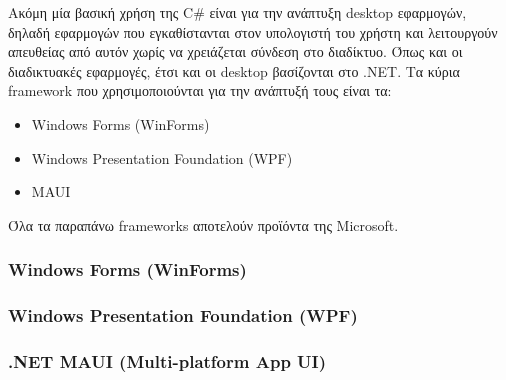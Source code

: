 Ακόμη μία βασική χρήση της C\# είναι για την ανάπτυξη desktop εφαρμογών,
δηλαδή εφαρμογών που εγκαθίστανται στον υπολογιστή του χρήστη και λειτουργούν
απευθείας από αυτόν χωρίς να χρειάζεται σύνδεση στο διαδίκτυο. Όπως και οι διαδικτυακές
εφαρμογές, έτσι και οι desktop βασίζονται στο .NET. Τα κύρια framework που χρησιμοποιούνται 
για την ανάπτυξή τους είναι τα:
\begin{itemize}
    \item Windows Forms (WinForms)
    \item Windows Presentation Foundation (WPF)
    \item MAUI
\end{itemize}
Όλα τα παραπάνω frameworks αποτελούν προϊόντα της Microsoft.

\subsubsection{Windows Forms (WinForms)}


\subsubsection{Windows Presentation Foundation (WPF)}


\subsubsection{.ΝΕΤ MAUI (Multi-platform App UI)}
